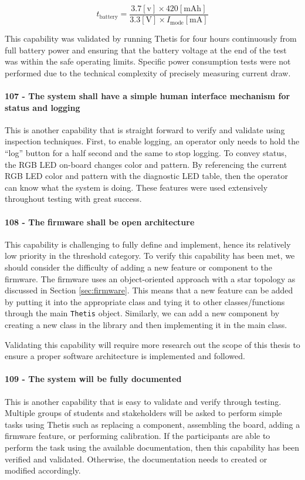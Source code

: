 \begin{equation} \label{eq:battery_life}
    t_{\text{battery}} = \frac{3.7 [\text{v}] \times 420 [\text{mAh}]}{3.3 [\text{V}] \times I_{\text{mode}} [\text{mA}]}
\end{equation}

This capability was validated by running Thetis for four hours continuously from full battery power and ensuring that the battery voltage at the end of the test was within the safe operating limits.
Specific power consumption tests were not performed due to the technical complexity of precisely measuring current draw.

\paragraph*{107 - The system shall have a simple human interface mechanism for status and logging} This is another capability that is straight forward to verify and validate using inspection techniques.
First, to enable logging, an operator only needs to hold the ``log'' button for a half second and the same to stop logging.
To convey status, the RGB LED on-board changes color and pattern.
By referencing the current RGB LED color and pattern with the diagnostic LED table, then the operator can know what the system is doing.
These features were used extensively throughout testing with great success.

\paragraph*{108 - The firmware shall be open architecture} This capability is challenging to fully define and implement, hence its relatively low priority in the threshold category.
To verify this capability has been met, we should consider the difficulty of adding a new feature or component to the firmware.
The firmware uses an object-oriented approach with a star topology as discussed in Section \ref{sec:firmware}.
This means that a new feature can be added by putting it into the appropriate class and tying it to other classes/functions through the main \lstinline[style=customInline]|Thetis| object.
Similarly, we can add a new component by creating a new class in the library and then implementing it in the main class.

Validating this capability will require more research out the scope of this thesis to ensure a proper software architecture is implemented and followed.

\paragraph*{109 - The system will be fully documented} This is another capability that is easy to validate and verify through testing.
Multiple groups of students and stakeholders will be asked to perform simple tasks using Thetis such as replacing a component, assembling the board, adding a firmware feature, or performing calibration.
If the participants are able to perform the task using the available documentation, then this capability has been verified and validated.
Otherwise, the documentation needs to created or modified accordingly.

